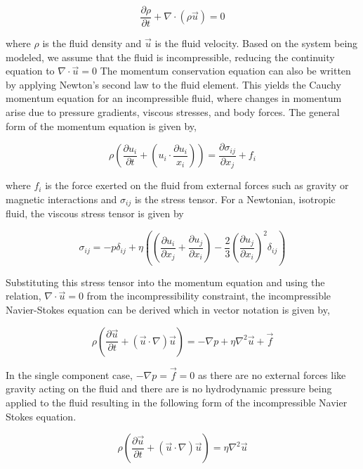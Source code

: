 \begin{equation}
    \frac{\partial\rho}{\partial t} + \nabla\cdot\left(\rho\vec{u}\right) = 0
\end{equation}

where $\rho$ is the fluid density and $\vec{u}$ is the fluid velocity. Based on the system being modeled, we assume that the fluid is incompressible, reducing the continuity equation to
$\nabla\cdot \vec{u} = 0$ The momentum conservation equation can also be written by applying Newton's second law to the fluid element. This yields the Cauchy momentum equation for an
incompressible fluid, where changes in momentum arise due to pressure gradients, viscous stresses, and body forces. The general form of the momentum equation is given by,

\begin{equation}
    \rho \left(\frac{\partial u_i}{\partial t} + (u_i\cdot\frac{\partial u_i}{x_i}) \right) = \frac{\partial \sigma_{ij}}{\partial x_j} + f_i
\end{equation}

where $f_i$ is the force exerted on the fluid from external forces such as gravity or magnetic interactions and $\sigma_{ij}$ is the stress tensor. For a Newtonian, isotropic fluid, 
the viscous stress tensor is given by

\begin{equation}
    \sigma_{ij} = -p\delta_{ij} + \eta((\frac{\partial u_i}{\partial x_j} + \frac{\partial u_j}{\partial x_i}) - \frac{2}{3}(\frac{\partial u_j}{\partial x_i})^2\delta_{ij})
\end{equation}

Substituting this stress tensor into the momentum equation and using the relation, $\nabla\cdot \vec{u} = 0$ from the incompressibility constraint, the incompressible 
Navier-Stokes equation can be derived which in vector notation is given by,

\begin{equation}
    \rho \left(\frac{\partial\vec{u}}{\partial t} + (\vec{u}\cdot\nabla)\vec{u} \right) = -\nabla p + \eta \nabla^2 \vec{u} + \vec{f}
\end{equation}

In the single component case, $-\nabla p = \vec{f} = 0$ as there are no external forces like gravity acting on the fluid and there are is no hydrodynamic pressure being applied to the 
fluid resulting in the following form of the incompressible Navier Stokes equation.

\begin{equation}
    \rho \left(\frac{\partial\vec{u}}{\partial t} + (\vec{u}\cdot\nabla)\vec{u} \right) = \eta \nabla^2 \vec{u}
\end{equation}

